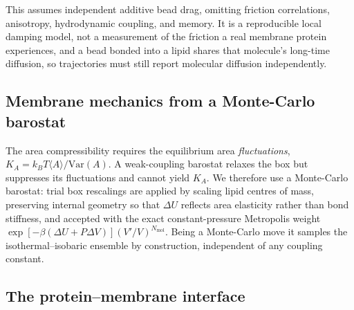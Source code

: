 \documentclass[journal=jctcce,manuscript=article,layout=twocolumn]{achemso}
\begin{document}
This assumes independent additive bead drag, omitting friction correlations,
anisotropy, hydrodynamic coupling, and memory. It is a reproducible local damping
model, not a measurement of the friction a real membrane protein experiences, and a
bead bonded into a lipid shares that molecule's long-time diffusion, so trajectories
must still report molecular diffusion independently.

\subsection{Membrane mechanics from a Monte-Carlo barostat}
\label{sec:mechanics}

The area compressibility requires the equilibrium area \emph{fluctuations},
$K_A=k_BT\langle A\rangle/\mathrm{Var}(A)$. A weak-coupling barostat relaxes the box
but suppresses its fluctuations and cannot yield $K_A$. We therefore use a
Monte-Carlo barostat: trial box rescalings are applied by scaling lipid centres of
mass, preserving internal geometry so that $\Delta U$ reflects area elasticity
rather than bond stiffness, and accepted with the exact constant-pressure Metropolis
weight $\exp[-\beta(\Delta U+P\Delta V)](V'/V)^{N_\mathrm{mol}}$. Being a
Monte-Carlo move it samples the isothermal--isobaric ensemble by construction,
independent of any coupling constant.

\subsection{The protein--membrane interface}
\label{sec:interface}
\end{document}
